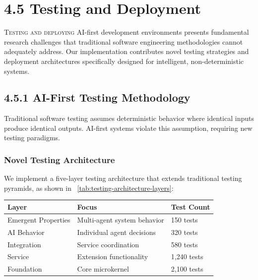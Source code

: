 

\section{4.5 Testing and Deployment}
\label{sec:testing-deployment-impl}

\lettrine{T}{esting and deploying} AI-first development environments presents fundamental research challenges that traditional software engineering methodologies cannot adequately address. Our implementation contributes novel testing strategies and deployment architectures specifically designed for intelligent, non-deterministic systems.

\subsection*{4.5.1 AI-First Testing Methodology}
\label{subsec:ai-first-testing}

Traditional software testing assumes deterministic behavior where identical inputs produce identical outputs. AI-first systems violate this assumption, requiring new testing paradigms.

\subsubsection*{Novel Testing Architecture}

We implement a five-layer testing architecture that extends traditional testing pyramids, as shown in ~\ref{tab:testing-architecture-layers}:

\begin{center}
\begin{tabular}{@{}lll@{}}
\toprule
\textbf{Layer} & \textbf{Focus} & \textbf{Test Count} \\
\midrule
Emergent Properties & Multi-agent system behavior & 150 tests \\
AI Behavior & Individual agent decisions & 320 tests \\
Integration & Service coordination & 580 tests \\
Service & Extension functionality & 1,240 tests \\
Foundation & Core microkernel & 2,100 tests \\
\bottomrule
\end{tabular}
\label{tab:testing-architecture-layers}
\end{center}

